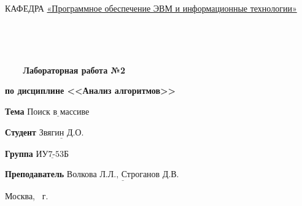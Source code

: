 \begin{titlepage}
\noindent КАФЕДРА \underline{«Программное обеспечение ЭВМ и информационные технологии»}

\

\

\begin{center}
\noindent\begin{minipage}{1.0\textwidth}\centering
\Large\textbf{   ~~~ Лабораторная работа №2}

\textbf{по дисциплине <<Анализ алгоритмов>>}

\end{minipage}
\end{center}
\noindent\textbf{Тема} $\underline{\text{Поиск в массиве}}$

\noindent\textbf{Студент} $\underline{\text{Звягин Д.О.}}$

\noindent\textbf{Группа} $\underline{\text{ИУ7-53Б}}$

\noindent\textbf{Преподаватель} $\underline{\text{Волкова Л.Л., Строганов Д.В.}}$

\begin{center}
\mbox{}
\vfill
Москва, \the\year ~г.
\end{center}
\clearpage
\end{titlepage}
